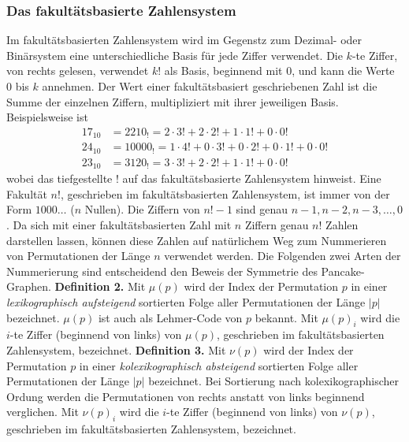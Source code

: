 \documentclass[a4paper, 11pt, ngerman]{article}
\begin{document}
\subsubsection*{Das fakultätsbasierte Zahlensystem}
Im fakultätsbasierten Zahlensystem wird im Gegenstz zum Dezimal- oder Binärsystem eine unterschiedliche Basis für jede Ziffer verwendet. Die $k$-te Ziffer, von rechts gelesen, verwendet $k!$ als Basis, beginnend mit 0, und kann die Werte 0 bis $k$ annehmen. Der Wert einer fakultätsbasiert geschriebenen Zahl ist die Summe der einzelnen Ziffern, multipliziert mit ihrer jeweiligen Basis. Beispielsweise ist
\begin{align*}
    17_{10} & = 2210_!   = 2 \cdot 3! + 2 \cdot 2! + 1 \cdot 1! + 0 \cdot 0!             \\
    24_{10} & = 10000_! = 1 \cdot 4! + 0 \cdot 3! + 0 \cdot 2! + 0 \cdot 1! + 0 \cdot 0! \\
    23_{10} & = 3120_!  = 3 \cdot 3! + 2 \cdot 2! + 1 \cdot 1! + 0 \cdot 0!
\end{align*}
wobei das tiefgestellte ! auf das fakultätsbasierte Zahlensystem hinweist. Eine Fakultät $n!$, geschrieben im fakultätsbasierten Zahlensystem, ist immer von der Form $1000\dots$ ($n$ Nullen). Die Ziffern von $n! - 1$ sind genau $n-1, n-2, n-3, \dots, 0$.
Da sich mit einer fakultätsbasierten Zahl mit $n$ Ziffern genau $n!$ Zahlen darstellen lassen, können diese Zahlen auf natürlichem Weg zum Nummerieren von Permutationen der Länge $n$ verwendet werden. Die Folgenden zwei Arten der Nummerierung sind entscheidend den Beweis der Symmetrie des Pancake-Graphen.
\newline \newline
\textbf{Definition 2.} Mit $\mu(p)$ wird der Index der Permutation $p$ in einer \emph{lexikographisch aufsteigend} sortierten Folge aller Permutationen der Länge $|p|$ bezeichnet. $\mu(p)$ ist auch als Lehmer-Code von $p$ bekannt. Mit $\mu(p)_i$ wird die $i$-te Ziffer (beginnend von links) von $\mu(p)$, geschrieben im fakultätsbasierten Zahlensystem, bezeichnet.
\newline \newline
\textbf{Definition 3.} Mit $\nu(p)$ wird der Index der Permutation $p$ in einer \emph{kolexikographisch absteigend} sortierten Folge aller Permutationen der Länge $|p|$ bezeichnet. Bei Sortierung nach kolexikographischer Ordung werden die Permutationen von rechts anstatt von links beginnend verglichen. Mit $\nu(p)_i$ wird die $i$-te Ziffer (beginnend von links) von $\nu(p)$, geschrieben im fakultätsbasierten Zahlensystem, bezeichnet.
\end{document}
